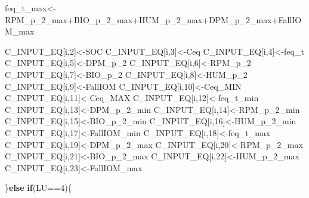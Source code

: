 \documentclass[
  10pt,
  b5paper,
]{book}
\newenvironment{Shaded}{\begin{snugshade}}{\end{snugshade}}
\newcommand{\ControlFlowTok}[1]{\textcolor[rgb]{0.13,0.29,0.53}{\textbf{#1}}}
\newcommand{\DecValTok}[1]{\textcolor[rgb]{0.00,0.00,0.81}{#1}}
\newcommand{\NormalTok}[1]{#1}
\newcommand{\OtherTok}[1]{\textcolor[rgb]{0.56,0.35,0.01}{#1}}
\newcommand{\SpecialCharTok}[1]{\textcolor[rgb]{0.00,0.00,0.00}{#1}}
\begin{document}
\begin{Shaded}
\begin{Highlighting}[]
\NormalTok{feq\_t\_max}\OtherTok{\textless{}{-}}\NormalTok{RPM\_p\_2\_max}\SpecialCharTok{+}\NormalTok{BIO\_p\_2\_max}\SpecialCharTok{+}\NormalTok{HUM\_p\_2\_max}\SpecialCharTok{+}\NormalTok{DPM\_p\_2\_max}\SpecialCharTok{+}\NormalTok{FallIOM\_max}

\NormalTok{C\_INPUT\_EQ[i,}\DecValTok{2}\NormalTok{]}\OtherTok{\textless{}{-}}\NormalTok{SOC}
\NormalTok{C\_INPUT\_EQ[i,}\DecValTok{3}\NormalTok{]}\OtherTok{\textless{}{-}}\NormalTok{Ceq}
\NormalTok{C\_INPUT\_EQ[i,}\DecValTok{4}\NormalTok{]}\OtherTok{\textless{}{-}}\NormalTok{feq\_t}
\NormalTok{C\_INPUT\_EQ[i,}\DecValTok{5}\NormalTok{]}\OtherTok{\textless{}{-}}\NormalTok{DPM\_p\_2}
\NormalTok{C\_INPUT\_EQ[i,}\DecValTok{6}\NormalTok{]}\OtherTok{\textless{}{-}}\NormalTok{RPM\_p\_2}
\NormalTok{C\_INPUT\_EQ[i,}\DecValTok{7}\NormalTok{]}\OtherTok{\textless{}{-}}\NormalTok{BIO\_p\_2}
\NormalTok{C\_INPUT\_EQ[i,}\DecValTok{8}\NormalTok{]}\OtherTok{\textless{}{-}}\NormalTok{HUM\_p\_2}
\NormalTok{C\_INPUT\_EQ[i,}\DecValTok{9}\NormalTok{]}\OtherTok{\textless{}{-}}\NormalTok{FallIOM}
\NormalTok{C\_INPUT\_EQ[i,}\DecValTok{10}\NormalTok{]}\OtherTok{\textless{}{-}}\NormalTok{Ceq\_MIN}
\NormalTok{C\_INPUT\_EQ[i,}\DecValTok{11}\NormalTok{]}\OtherTok{\textless{}{-}}\NormalTok{Ceq\_MAX}
\NormalTok{C\_INPUT\_EQ[i,}\DecValTok{12}\NormalTok{]}\OtherTok{\textless{}{-}}\NormalTok{feq\_t\_min}
\NormalTok{C\_INPUT\_EQ[i,}\DecValTok{13}\NormalTok{]}\OtherTok{\textless{}{-}}\NormalTok{DPM\_p\_2\_min}
\NormalTok{C\_INPUT\_EQ[i,}\DecValTok{14}\NormalTok{]}\OtherTok{\textless{}{-}}\NormalTok{RPM\_p\_2\_min}
\NormalTok{C\_INPUT\_EQ[i,}\DecValTok{15}\NormalTok{]}\OtherTok{\textless{}{-}}\NormalTok{BIO\_p\_2\_min}
\NormalTok{C\_INPUT\_EQ[i,}\DecValTok{16}\NormalTok{]}\OtherTok{\textless{}{-}}\NormalTok{HUM\_p\_2\_min}
\NormalTok{C\_INPUT\_EQ[i,}\DecValTok{17}\NormalTok{]}\OtherTok{\textless{}{-}}\NormalTok{FallIOM\_min}
\NormalTok{C\_INPUT\_EQ[i,}\DecValTok{18}\NormalTok{]}\OtherTok{\textless{}{-}}\NormalTok{feq\_t\_max}
\NormalTok{C\_INPUT\_EQ[i,}\DecValTok{19}\NormalTok{]}\OtherTok{\textless{}{-}}\NormalTok{DPM\_p\_2\_max}
\NormalTok{C\_INPUT\_EQ[i,}\DecValTok{20}\NormalTok{]}\OtherTok{\textless{}{-}}\NormalTok{RPM\_p\_2\_max}
\NormalTok{C\_INPUT\_EQ[i,}\DecValTok{21}\NormalTok{]}\OtherTok{\textless{}{-}}\NormalTok{BIO\_p\_2\_max}
\NormalTok{C\_INPUT\_EQ[i,}\DecValTok{22}\NormalTok{]}\OtherTok{\textless{}{-}}\NormalTok{HUM\_p\_2\_max}
\NormalTok{C\_INPUT\_EQ[i,}\DecValTok{23}\NormalTok{]}\OtherTok{\textless{}{-}}\NormalTok{FallIOM\_max}

\NormalTok{\}}\ControlFlowTok{else} \ControlFlowTok{if}\NormalTok{(LU}\SpecialCharTok{==}\DecValTok{4}\NormalTok{)\{}


\end{Highlighting}
\end{Shaded}
\end{document}

